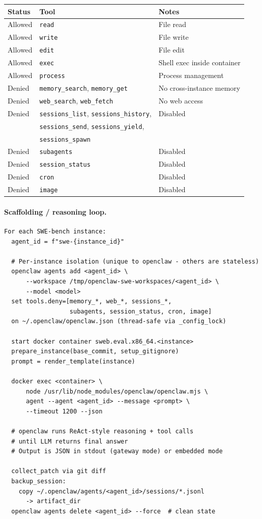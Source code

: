 \documentclass{llmxive}
\begin{document}
\begin{center}
\begin{tabular}{lll}
\toprule
\textbf{Status} & \textbf{Tool} & \textbf{Notes} \\
\midrule
Allowed & \texttt{read} & File read \\
Allowed & \texttt{write} & File write \\
Allowed & \texttt{edit} & File edit \\
Allowed & \texttt{exec} & Shell exec inside container \\
Allowed & \texttt{process} & Process management \\
Denied & \texttt{memory\_search}, \texttt{memory\_get} & No cross-instance memory \\
Denied & \texttt{web\_search}, \texttt{web\_fetch} & No web access \\
Denied & \texttt{sessions\_list}, \texttt{sessions\_history}, & Disabled \\
        & \texttt{sessions\_send}, \texttt{sessions\_yield}, & \\
        & \texttt{sessions\_spawn} & \\
Denied & \texttt{subagents} & Disabled \\
Denied & \texttt{session\_status} & Disabled \\
Denied & \texttt{cron} & Disabled \\
Denied & \texttt{image} & Disabled \\
\bottomrule
\end{tabular}
\end{center}

\paragraph{Scaffolding / reasoning loop.}
\begin{verbatim}
For each SWE-bench instance:
  agent_id = f"swe-{instance_id}"

  # Per-instance isolation (unique to openclaw - others are stateless)
  openclaw agents add <agent_id> \
      --workspace /tmp/openclaw-swe-workspaces/<agent_id> \
      --model <model>
  set tools.deny=[memory_*, web_*, sessions_*,
                  subagents, session_status, cron, image]
  on ~/.openclaw/openclaw.json (thread-safe via _config_lock)

  start docker container sweb.eval.x86_64.<instance>
  prepare_instance(base_commit, setup_gitignore)
  prompt = render_template(instance)

  docker exec <container> \
      node /usr/lib/node_modules/openclaw/openclaw.mjs \
      agent --agent <agent_id> --message <prompt> \
      --timeout 1200 --json

  # openclaw runs ReAct-style reasoning + tool calls
  # until LLM returns final answer
  # Output is JSON in stdout (gateway mode) or embedded mode

  collect_patch via git diff
  backup_session:
    copy ~/.openclaw/agents/<agent_id>/sessions/*.jsonl
      -> artifact_dir
  openclaw agents delete <agent_id> --force  # clean state
\end{verbatim}
\end{document}
